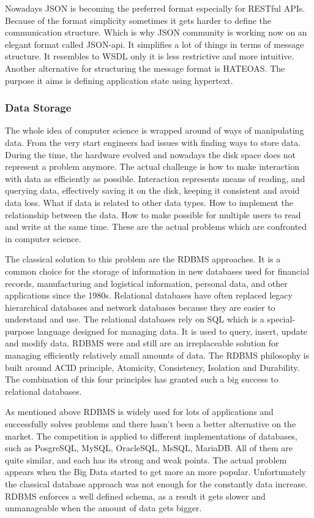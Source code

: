 Nowadays JSON is becoming the preferred format especially for RESTful APIs. Because of the format simplicity sometimes it gets harder to define the communication structure. Which is why JSON community is working now on an elegant format called JSON-api. It simplifies a lot of things in terms of message structure. It resembles to WSDL only it is less restrictive and more intuitive. Another alternative for structuring the message format is HATEOAS. The purpose it aims is defining application state using hypertext.

\subsubsection{Data Storage}
The whole idea of computer science is wrapped around of ways of manipulating data. From the very start engineers had issues with finding ways to store data. During the time, the hardware evolved and nowadays the disk space does not represent a problem anymore. The actual challenge is how to make interaction with data as efficiently as possible. Interaction represents means of reading, and querying data, effectively saving it on the disk, keeping it consistent and avoid data loss. What if data is related to other data types. How to  implement the relationship between the data. How to make possible for multiple users to read and write at the same time. These are the actual problems which are confronted in computer science.

The classical solution to this problem are the RDBMS approaches. It is a common choice for the storage of information in new databases used for financial records, manufacturing and logistical information, personal data, and other applications since the 1980s. Relational databases have often replaced legacy hierarchical databases and network databases because they are easier to understand and use. The relational databases rely on SQL which is a special-purpose language designed for managing data. It is used to query, insert, update and modify data. RDBMS were and still are an irreplaceable solution for managing efficiently relatively small amounts of data. The RDBMS philosophy is built around ACID principle, Atomicity, Consistency, Isolation and Durability. The combination of this four principles has granted such a big success to relational databases.

As mentioned above RDBMS is widely used for lots of applications and successfully solves problems and there hasn't been a better alternative on the market. The competition is applied to different implementations of databases, such as PosgreSQL, MySQL, OracleSQL, MsSQL, MariaDB. All of them are quite similar, and each has its strong and weak points. The actual problem appears when the Big Data started to get more an more popular. Unfortunately the classical database approach was not enough for the constantly data increase. RDBMS enforces a well defined schema, as a result it gets slower and unmanageable when the amount of data gets bigger.

